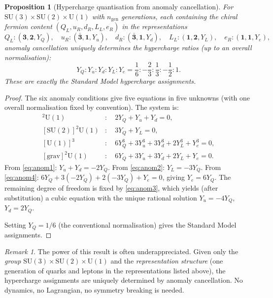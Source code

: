 \documentclass[12pt]{article}
\newtheorem{proposition}[theorem]{Proposition}
\theoremstyle{definition}
\theoremstyle{remark}
\newtheorem{remark}[theorem]{Remark}
\newcommand{\SU}{\mathrm{SU}}
\newcommand{\UU}{\mathrm{U}}
\begin{document}
\begin{proposition}[Hypercharge quantisation from anomaly cancellation]
\label{prop:hypercharge}
For $\SU(3) \times \SU(2) \times \UU(1)$ with $n_{\mathrm{gen}}$
generations, each containing the chiral fermion content
$(Q_L, u_R, d_R, L_L, e_R)$ in the representations
\[
  Q_L : (\mathbf{3}, \mathbf{2}, Y_Q), \quad
  u_R : (\bar{\mathbf{3}}, \mathbf{1}, Y_u), \quad
  d_R : (\bar{\mathbf{3}}, \mathbf{1}, Y_d), \quad
  L_L : (\mathbf{1}, \mathbf{2}, Y_L), \quad
  e_R : (\mathbf{1}, \mathbf{1}, Y_e),
\]
anomaly cancellation uniquely determines the hypercharge
ratios (up to an overall normalisation):
\[
  Y_Q : Y_u : Y_d : Y_L : Y_e
  = \frac{1}{6} : -\frac{2}{3} : \frac{1}{3} : -\frac{1}{2} : 1.
\]
These are exactly the Standard Model hypercharge assignments.
\end{proposition}

\begin{proof}
The six anomaly conditions give five equations in five unknowns
(with one overall normalisation fixed by convention).  The system
is:
\begin{align}
  [\SU(3)]^2\UU(1)&: \quad 2Y_Q + Y_u + Y_d = 0, \label{eq:anom1} \\
  [\SU(2)]^2\UU(1)&: \quad 3Y_Q + Y_L = 0, \label{eq:anom2} \\
  [\UU(1)]^3&: \quad 6Y_Q^3 + 3Y_u^3 + 3Y_d^3 + 2Y_L^3 + Y_e^3 = 0, \label{eq:anom3} \\
  [\text{grav}]^2\UU(1)&: \quad 6Y_Q + 3Y_u + 3Y_d + 2Y_L + Y_e = 0. \label{eq:anom4}
\end{align}
From \eqref{eq:anom1}: $Y_u + Y_d = -2Y_Q$.
From \eqref{eq:anom2}: $Y_L = -3Y_Q$.
From \eqref{eq:anom4}: $6Y_Q + 3(-2Y_Q) + 2(-3Y_Q) + Y_e = 0$,
giving $Y_e = 6Y_Q$.
The remaining degree of freedom is fixed by \eqref{eq:anom3},
which yields (after substitution) a cubic equation with the
unique rational solution $Y_u = -4Y_Q$, $Y_d = 2Y_Q$.

Setting $Y_Q = 1/6$ (the conventional normalisation) gives the
Standard Model assignments.
\end{proof}

\begin{remark}
The power of this result is often underappreciated.
Given only the \emph{group} $\SU(3) \times \SU(2) \times \UU(1)$
and the \emph{representation structure} (one generation of quarks
and leptons in the representations listed above), the hypercharge
assignments are uniquely determined by anomaly cancellation.
No dynamics, no Lagrangian, no symmetry breaking is needed.
\end{remark}
\end{document}
